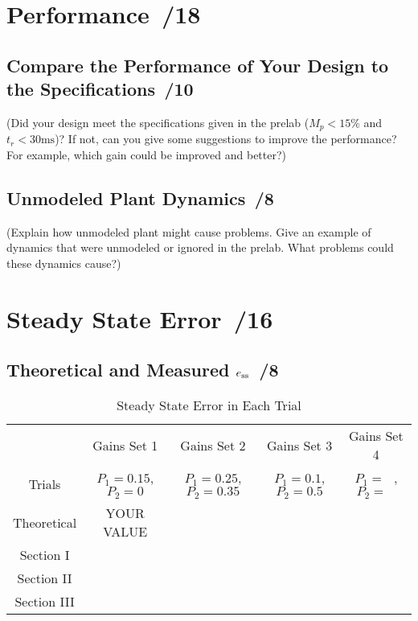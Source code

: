 \documentclass{article}
\newcommand{\score}{\hfill \underline{\hspace{0.65cm}}\,/} %
\begin{document}
\section{Performance \score 18}
\subsection{Compare the Performance of Your Design to the Specifications  \score 10}
(Did your design meet the specifications given in the prelab ($M_p < 15\%$ and $t_r < 30 \si{\milli\second}$)? If not, can you give some suggestions to improve the performance? For example, which gain could be improved and better?)
\subsection{Unmodeled Plant Dynamics \score 8}
(Explain how unmodeled plant might cause problems. Give an example of dynamics that were unmodeled or ignored in the prelab. What problems could these dynamics cause?)

\section{Steady State Error \score 16}
\subsection{Theoretical and Measured $e_{\rm ss}$ \score 8}
\begin{table}[phtb]\footnotesize 
\begin{center}
\caption{Steady State Error in Each Trial}
\label{tbl:lab5_q3}
\begin{tabular}{c|m{1.2cm}|m{1.2cm}|m{1.2cm}|m{1.2cm}|m{1.2cm}|m{1.2cm}|m{1.2cm}|m{1.2cm}} \hline \hline
\cellcolor{lightgray} & \multicolumn{2}{c|}{\cellcolor{lightgray}Gains Set 1} & \multicolumn{2}{c|}{\cellcolor{lightgray}Gains Set 2} & \multicolumn{2}{c|}{\cellcolor{lightgray}Gains Set 3} & \multicolumn{2}{c}{\cellcolor{lightgray}Gains Set 4}\\ \cline{2-9}
\multirow{-2}{*}{\cellcolor{lightgray}Trials}& \multicolumn{2}{c|}{$P_1 = 0.15$, $P_2 = 0$}& \multicolumn{2}{c|}{$P_1 = 0.25$, $P_2 = 0.35$}& \multicolumn{2}{c|}{$P_1 = 0.1$, $P_2 = 0.5$}& \multicolumn{2}{c}{$P_1 = ~~~$, $P_2 = ~~~$}\\ \hline
Theoretical & \multicolumn{2}{c|}{YOUR VALUE} & \multicolumn{2}{c|}{~} & \multicolumn{2}{c|}{~} & \multicolumn{2}{c}{~} \\ \hline
Section I & \multicolumn{2}{c|}{} & \multicolumn{2}{c|}{} & \multicolumn{2}{c|}{} & \multicolumn{2}{c}{} \\ \hline
Section II & \multicolumn{2}{c|}{} & \multicolumn{2}{c|}{} & \multicolumn{2}{c|}{} & \multicolumn{2}{c}{} \\ \hline
Section III & \multicolumn{2}{c|}{} & \multicolumn{2}{c|}{} & \multicolumn{2}{c|}{} & \multicolumn{2}{c}{} \\ \hline
\end{tabular}
\end{center}
\end{table}
\end{document}

